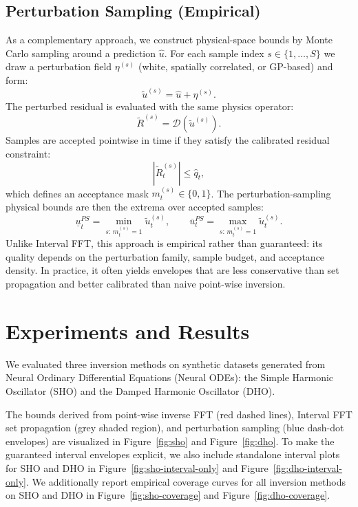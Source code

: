 \documentclass{article}
\begin{document}
\subsection{Perturbation Sampling (Empirical)}
As a complementary approach, we construct physical-space bounds by Monte Carlo sampling around a prediction $\hat{u}$. For each sample index $s \in \{1,\dots,S\}$ we draw a perturbation field $\eta^{(s)}$ (white, spatially correlated, or GP-based) and form:
\begin{equation}
    \tilde{u}^{(s)} = \hat{u} + \eta^{(s)}.
\end{equation}
The perturbed residual is evaluated with the same physics operator:
\begin{equation}
    \tilde{R}^{(s)} = \mathcal{D}\!\left(\tilde{u}^{(s)}\right).
\end{equation}
Samples are accepted pointwise in time if they satisfy the calibrated residual constraint:
\begin{equation}
    \left|\tilde{R}^{(s)}_t\right| \le \hat{q}_t,
\end{equation}
which defines an acceptance mask $m_t^{(s)} \in \{0,1\}$. The perturbation-sampling physical bounds are then the extrema over accepted samples:
\begin{equation}
    \underline{u}^{PS}_t = \min_{s:\,m_t^{(s)}=1} \tilde{u}^{(s)}_t,
    \qquad
    \overline{u}^{PS}_t = \max_{s:\,m_t^{(s)}=1} \tilde{u}^{(s)}_t.
\end{equation}
Unlike Interval FFT, this approach is empirical rather than guaranteed: its quality depends on the perturbation family, sample budget, and acceptance density. In practice, it often yields envelopes that are less conservative than set propagation and better calibrated than naive point-wise inversion.

\section{Experiments and Results}
We evaluated three inversion methods on synthetic datasets generated from Neural Ordinary Differential Equations (Neural ODEs): the Simple Harmonic Oscillator (SHO) and the Damped Harmonic Oscillator (DHO).

The bounds derived from point-wise inverse FFT (red dashed lines), Interval FFT set propagation (grey shaded region), and perturbation sampling (blue dash-dot envelopes) are visualized in Figure~\ref{fig:sho} and Figure~\ref{fig:dho}. To make the guaranteed interval envelopes explicit, we also include standalone interval plots for SHO and DHO in Figure~\ref{fig:sho-interval-only} and Figure~\ref{fig:dho-interval-only}. We additionally report empirical coverage curves for all inversion methods on SHO and DHO in Figure~\ref{fig:sho-coverage} and Figure~\ref{fig:dho-coverage}.
\end{document}
